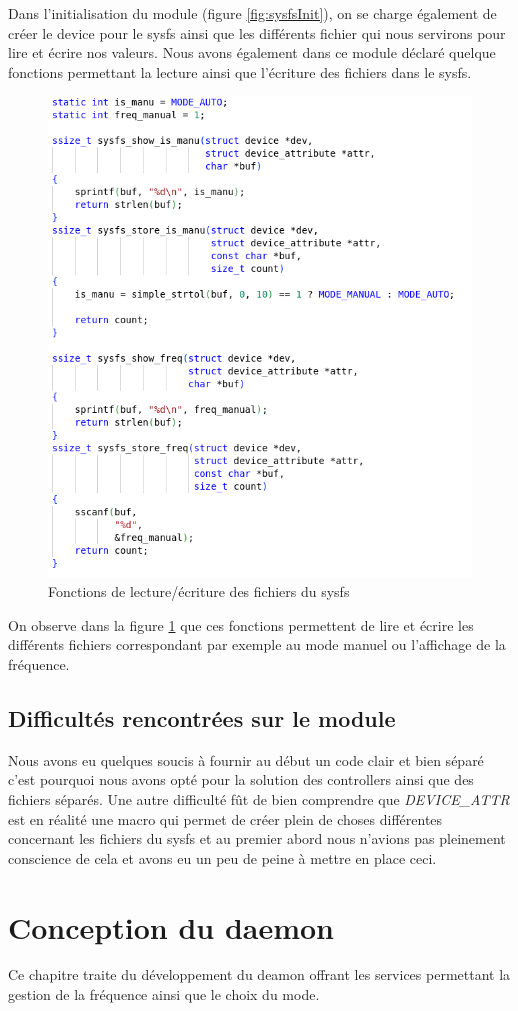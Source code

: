 \documentclass{ReportTemplate}
\begin{document}
Dans l'initialisation du module (figure \ref{fig:sysfsInit}), on se charge également de créer le device pour
le sysfs ainsi que les différents fichier qui nous servirons pour lire et écrire
nos valeurs.\newpage
Nous avons également dans ce module déclaré quelque fonctions permettant la
lecture ainsi que l'écriture des fichiers dans le sysfs.
\begin{figure}[H]
    \includegraphics[width= \textwidth]{imageSources/Utility_Fct_Module.png}
    \caption{Fonctions de lecture/écriture des fichiers du sysfs}
    \label{fig:sysfsFunctions}
\end{figure}
On observe dans la figure \ref{fig:sysfsFunctions} que ces fonctions permettent
de lire et écrire les différents fichiers correspondant par exemple au mode
manuel ou l'affichage de la fréquence.\newpage
\section{Difficultés rencontrées sur le module}
Nous avons eu quelques soucis à fournir au début un code clair et bien séparé
c'est pourquoi nous avons opté pour la solution des controllers ainsi que des
fichiers séparés.\newline
Une autre difficulté fût de bien comprendre que \textit{DEVICE\_ATTR} est en
réalité une macro qui permet de créer plein de choses différentes concernant les
fichiers du sysfs et au premier abord nous n'avions pas pleinement conscience de
cela et avons eu un peu de peine à mettre en place ceci.
\chapter{Conception du daemon}
Ce chapitre traite du développement du deamon offrant les services permettant la
gestion de la fréquence ainsi que le choix du mode.
\end{document}
